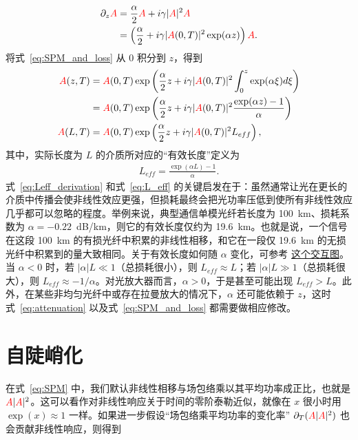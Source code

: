 \begin{align}
\label{eq:SPM_and_loss}
    \partial_z\textcolor{red}{A} &= \frac{\alpha}{2}\textcolor{red}{A} +i\gamma|\textcolor{red}{A}|^2\textcolor{red}{A}\\ \nonumber
    &=\left(\frac{\alpha}{2} +i\gamma |\textcolor{red}{A}(0,T)|^2 \exp(\alpha z) \right)\textcolor{red}{A}.
\end{align}
将式~\ref{eq:SPM_and_loss} 从 $0$ 积分到 $z$，得到
\begin{align}
    \label{eq:Leff_derivation}
    \textcolor{red}{A}(z,T)&=\textcolor{red}{A}(0,T) \exp\left( \frac{\alpha}{2}z+i\gamma|\textcolor{red}{A}(0,T)|^2 \int_0^z \exp(\alpha\xi) d\xi  \right) \\ \nonumber
    &=\textcolor{red}{A}(0,T) \exp\left( \frac{\alpha}{2}z+i\gamma|\textcolor{red}{A}(0,T)|^2  \frac{\exp(\alpha z)-1}{\alpha}   \right) \\ \nonumber
    \textcolor{red}{A}(L,T)&=\textcolor{red}{A}(0,T) \exp\left( \frac{\alpha}{2}z+i\gamma|\textcolor{red}{A}(0,T)|^2  L_{eff}   \right),
\end{align}
其中，实际长度为 $L$ 的介质所对应的“有效长度”定义为
\begin{align}
\label{eq:L_eff}
    L_{eff}= \frac{\exp(\alpha L)-1}{\alpha}.
\end{align}
式~\ref{eq:Leff_derivation} 和式~\ref{eq:L_eff} 的关键启发在于：虽然通常让光在更长的介质中传播会使非线性效应更强，但损耗最终会把光功率压低到使所有非线性效应几乎都可以忽略的程度。举例来说，典型通信单模光纤若长度为 100~km、损耗系数为 $\alpha=-0.22$~dB/km，则它的有效长度仅约为 19.6~km。也就是说，一个信号在这段 100~km 的有损光纤中积累的非线性相移，和它在一段仅 19.6~km 的无损光纤中积累到的量大致相同。关于有效长度如何随 $\alpha$ 变化，可参考 \href{https://www.desmos.com/calculator/g6dadbxq33}{这个交互图}。当 $\alpha<0$ 时，若 $|\alpha|L\ll 1$（总损耗很小），则 $L_{eff}\approx L$；若 $|\alpha|L\gg 1$（总损耗很大），则 $L_{eff}\approx -1/\alpha$。对光放大器而言，$\alpha>0$，于是甚至可能出现 $L_{eff}>L$。此外，在某些非均匀光纤中或存在拉曼放大的情况下，$\alpha$ 还可能依赖于 $z$，这时式~\ref{eq:attenuation} 以及式~\ref{eq:SPM_and_loss} 都需要做相应修改。

\section{自陡峭化}
\label{sec:SS}
在式~\ref{eq:SPM} 中，我们默认非线性相移与场包络乘以其平均功率成正比，也就是 $\textcolor{red}{A}|\textcolor{red}{A}|^2$。这可以看作对非线性响应关于时间的零阶泰勒近似，就像在 $x$ 很小时用 $\exp(x)\approx1$ 一样。如果进一步假设“场包络乘平均功率的变化率” $\partial_T(\textcolor{red}{A}|\textcolor{red}{A}|^2)$ 也会贡献非线性响应，则得到

